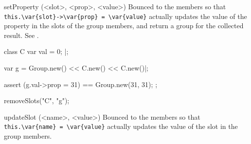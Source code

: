 \begin{urbiscriptapi}
\item[setProperty](<slot>, <prop>, <value>)%
  Bounced to the members so that
  \lstinline|this.\var{slot}->\var{prop} = \var{value}| actually updates the
  value of the property  in the slots  of the group
  members, and return a group for the collected result.  See
  .

\begin{urbiscript}
class C
{
  var val = 0;
}|;

var g = Group.new() << C.new() << C.new()|;

assert
{
  (g.val->prop = 31) == Group.new(31, 31);
};
\end{urbiscript}
\begin{urbicomment}
  removeSlots("C", "g");
\end{urbicomment}


\item[updateSlot](<name>, <value>)%
  Bounced to the members so that
  \lstinline|this.\var{name} = \var{value}|
  actually updates the value of the slot  in
  the group members.
\end{urbiscriptapi}

